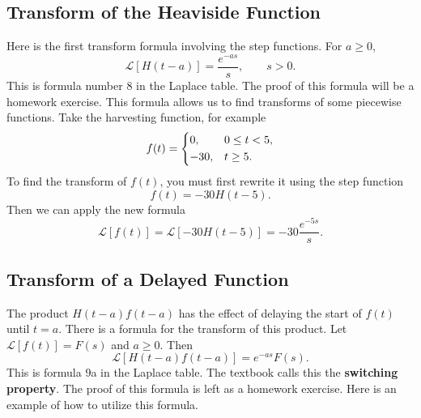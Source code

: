 \documentclass[10pt,letterpaper]{article}
\begin{document}
\subsection{Transform of the Heaviside Function}
Here is the first transform formula involving the step functions. For $a\ge0$,
\[
\boxed{
\mathcal L[H(t-a)]=\frac{e^{-as}}{s},
\qquad s>0.
}
\]
This is formula number 8 in the Laplace table.
The proof of this formula will be a homework exercise.
This formula allows us to find transforms of some piecewise functions. Take the harvesting function, for example 
\[
f(t)=
\begin{dcases}
0, & 0\le t<5,\\
-30, & t\ge5.
\end{dcases}
\]
To find the transform of $f(t)$, you must first rewrite it using the step function
$$
    f(t)=-30H(t-5).
$$
Then we can apply the new formula 
$$
    \mathcal{L}\left[f(t)\right] = \mathcal{L}\left[-30H(t-5)\right] = -30 \frac{e^{-5s}}{s}. 
$$


\subsection{Transform of a Delayed Function}

The product $H(t-a)f(t-a)$ has the effect of delaying the start of $f(t)$ until $t=a$. There is a formula for the transform of this product. Let $\mathcal L[f(t)]=F(s)$ and $a\ge0$. Then
\[
\boxed{
\mathcal L[H(t-a)f(t-a)]=e^{-as}F(s).
}
\]
This is formula 9a in the Laplace table. The textbook calls this the \textbf{switching property}. The proof of this formula is left as a homework exercise.
Here is an example of how to utilize this formula.
\end{document}
